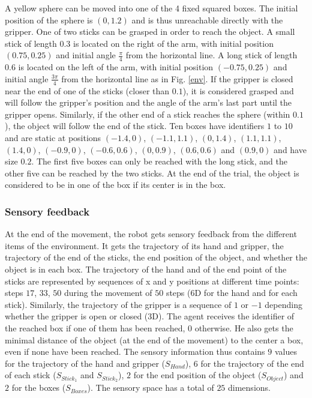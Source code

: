 \documentclass[10pt,letterpaper]{article}
\begin{document}
			A yellow sphere can be moved into one of the 4 fixed squared boxes. 
			The initial position of the sphere is $(0, 1.2)$ and is thus unreachable directly with the gripper.
			One of two sticks can be grasped in order to reach the object.
			A small stick of length $0.3$ is located on the right of the arm, with initial position $(0.75, 0.25)$ and initial angle $\frac{\pi}{4}$ from the horizontal line.
			A long stick of length $0.6$ is located on the left of the arm, with initial position $(-0.75, 0.25)$ and initial angle $\frac{3\pi}{4}$ from the horizontal line as in Fig. \ref{env}.			
			If the gripper is closed near the end of one of the sticks (closer than $0.1$), it is considered grasped and will follow the gripper's position and the angle of the arm's last part until the gripper opens.			
			Similarly, if the other end of a stick reaches the sphere (within $0.1$), the object will follow the end of the stick.
			Ten boxes have identifiers $1$ to $10$ and are static at positions $(-1.4, 0)$, $(-1.1, 1.1)$, $(0, 1.4)$, $(1.1, 1.1)$, $(1.4, 0)$, $(-0.9, 0)$, $(-0.6, 0.6)$, $(0, 0.9)$, $(0.6, 0.6)$ and $(0.9, 0)$ and have size $0.2$.
			The first five boxes can only be reached with the long stick, and the other five can be reached by the two sticks.
			At the end of the trial, the object is considered to be in one of the box if its center is in the box.\\
		
		
		\subsubsection{Sensory feedback}
		
			At the end of the movement, the robot gets sensory feedback from the different items of the environment.
			It gets the trajectory of its hand and gripper, the trajectory of the end of the sticks, 
			the end position of the object, and whether the object is in each box.		
			The trajectory of the hand and of the end point of the sticks are represented by sequences of x and y positions at different time points: 
			steps $17$, $33$, $50$ during the movement of $50$ steps ($6$D for the hand and for each stick).
			Similarly, the trajectory of the gripper is a sequence of $1$ or $-1$ depending whether the gripper is open or closed ($3$D).
			The agent receives the identifier of the reached box if one of them has been reached, 0 otherwise. He also gets the minimal distance of the object (at the end of the movement) to the center a box, even if none have been reached.
			The sensory information thus contains $9$ values for the trajectory of the hand and gripper ($S_{Hand}$), $6$ for the trajectory of the end of each stick ($S_{Stick_1}$ and $S_{Stick_2}$), $2$ for the end position of the object ($S_{Object}$) and $2$ for the boxes ($S_{Boxes}$).
			The sensory space has a total of $25$ dimensions.
			
\end{document}
